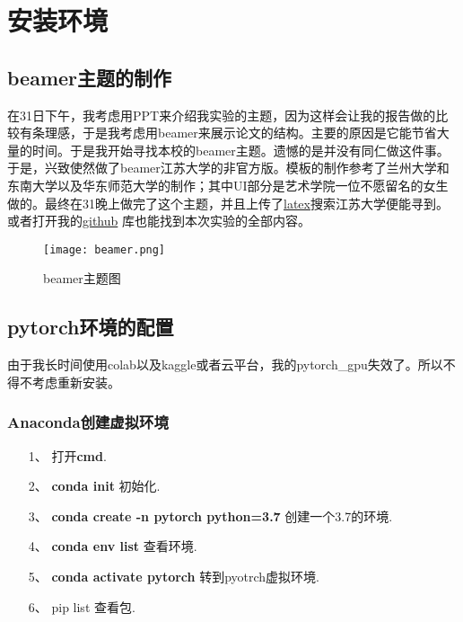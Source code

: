 \section{安装环境}
\subsection{beamer主题的制作}
在31日下午，我考虑用PPT来介绍我实验的主题，因为这样会让我的报告做的比较有条理感，于是我考虑用beamer来展示论文的结构。主要的原因是它能节省大量的时间。于是我开始寻找本校的beamer主题。遗憾的是并没有同仁做这件事。于是，兴致使然做了beamer江苏大学的非官方版。模板的制作参考了兰州大学和东南大学以及华东师范大学的制作；其中UI部分是艺术学院一位不愿留名的女生做的。最终在31晚上做完了这个主题，并且上传了\href{https://www.latexstudio.net/}{latex}搜索江苏大学便能寻到。或者打开我的\href{https://github.com/Luhuanz/pytorch}{github} 库也能找到本次实验的全部内容。
\begin{figure}[!h]
	\centering
	\texttt{[image: beamer.png]}
	\caption{beamer主题图}
	\label{fig:circuitm1}
\end{figure} \par
\subsection{pytorch环境的配置}
由于我长时间使用colab以及kaggle或者云平台，我的pytorch\_gpu失效了。所以不得不考虑重新安装。
\subsubsection{Anaconda创建虚拟环境}
	\begin{enumerate}
	\item [1、]  打开\textbf{cmd}.
	\item [2、]  \textbf{conda init} 初始化.
	\item[3、]  \textbf{conda create -n pytorch python=3.7} 创建一个3.7的环境.
	\item[4、 ] \textbf{conda env list} 查看环境.
	\item[5、]  \textbf{conda  activate pytorch} 转到pyotrch虚拟环境.
	\item [6、]  pip list 查看包.
	
\end{enumerate}

